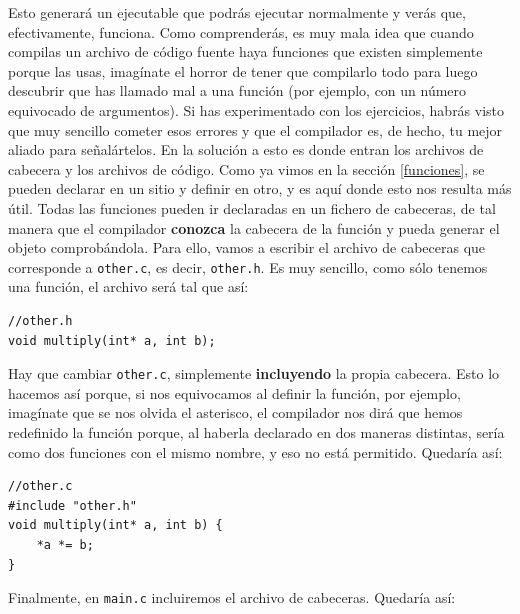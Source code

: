 \documentclass[a4paper]{article}
\begin{document}
Esto generará un ejecutable que podrás ejecutar normalmente y verás que,
efectivamente, funciona. Como comprenderás, es muy mala idea que cuando compilas
un archivo de código fuente haya funciones que existen simplemente porque las
usas, imagínate el horror de tener que compilarlo todo para luego descubrir que
has llamado mal a una función (por ejemplo, con un número equivocado de
argumentos). Si has experimentado con los ejercicios, habrás visto que muy
sencillo cometer esos errores y que el compilador es, de hecho, tu mejor aliado
para señalártelos. En la solución a esto es donde entran los archivos de cabecera
y los archivos de código. Como ya vimos en la sección \ref{funciones}, se pueden
declarar en un sitio y definir en otro, y es aquí donde esto nos resulta más
útil. Todas las funciones pueden ir declaradas en un fichero de cabeceras, de
tal manera que el compilador \textbf{conozca} la cabecera de la función y
pueda generar el objeto comprobándola. Para ello, vamos a escribir el archivo
de cabeceras que corresponde a \verb!other.c!, es decir, \verb!other.h!. Es muy
sencillo, como sólo tenemos una función, el archivo será tal que así:


\noindent
\begin{minipage}[H]{\linewidth}
\mbox{}
\begin{lstlisting}[style=C,
caption={Archivo de cabecera},
label={lst:headerFile}]
//other.h
void multiply(int* a, int b);
\end{lstlisting}
\end{minipage}

Hay que cambiar \verb!other.c!, simplemente \textbf{incluyendo} la propia
cabecera. Esto lo hacemos así porque, si nos equivocamos al definir la función,
por ejemplo, imagínate que se nos olvida el asterisco, el compilador nos dirá
que hemos redefinido la función porque, al haberla declarado en dos maneras
distintas, sería como dos funciones con el mismo nombre, y eso no está
permitido. Quedaría así:


\noindent
\begin{minipage}[H]{\linewidth}
\mbox{}
\begin{lstlisting}[style=C,
caption={Archivo de definiciones con cabecera incluida},
label={lst:fileCofHeader}]
//other.c
#include "other.h"
void multiply(int* a, int b) {
    *a *= b;
}
\end{lstlisting}
\end{minipage}

Finalmente, en \verb!main.c! incluiremos el archivo de cabeceras. Quedaría así:
\end{document}
